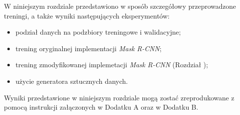 
W niniejszym rozdziale przedstawiono w sposób szczegółowy przeprowadzone treningi, a także wyniki następujących eksperymentów:

\begin{itemize}
 \item podział danych na podzbiory treningowe i walidacyjne;
 \item trening oryginalnej implementacji \textit{Mask R-CNN};
 \item trening zmodyfikowanej implemetacji \textit{Mask R-CNN} (Rozdział );
 \item użycie generatora sztucznych danych.
\end{itemize}

Wyniki przedstawione w niniejszym rozdziale mogą zostać zreprodukowane z pomocą instrukcji załączonych w Dodatku A oraz w Dodatku B.
